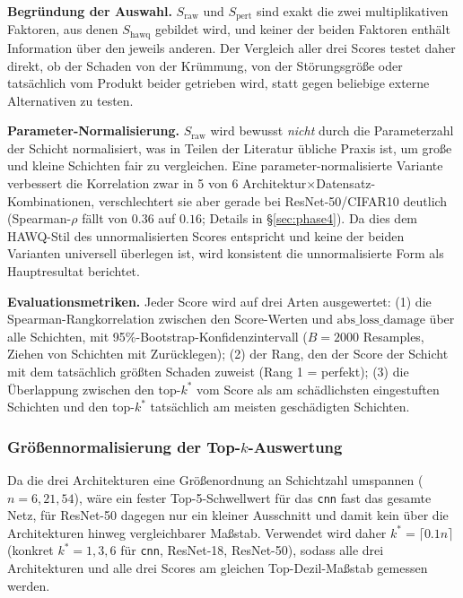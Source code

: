 \textbf{Begründung der Auswahl.} $S_{\mathrm{raw}}$ und $S_{\mathrm{pert}}$ sind exakt die zwei multiplikativen Faktoren, aus denen $S_{\mathrm{hawq}}$ gebildet wird, und keiner der beiden Faktoren enthält Information über den jeweils anderen. Der Vergleich aller drei Scores testet daher direkt, ob der Schaden von der Krümmung, von der Störungsgröße oder tatsächlich vom Produkt beider getrieben wird, statt gegen beliebige externe Alternativen zu testen.
\par\medskip

\textbf{Parameter-Normalisierung.} $S_{\mathrm{raw}}$ wird bewusst \emph{nicht} durch die Parameterzahl der Schicht normalisiert, was in Teilen der Literatur übliche Praxis ist, um große und kleine Schichten fair zu vergleichen. Eine parameter-normalisierte Variante verbessert die Korrelation zwar in 5 von 6 Architektur$\times$Datensatz-Kombinationen, verschlechtert sie aber gerade bei ResNet-50/CIFAR10 deutlich (Spearman-$\rho$ fällt von $0.36$ auf $0.16$; Details in \S\ref{sec:phase4}). Da dies dem HAWQ-Stil des unnormalisierten Scores entspricht und keine der beiden Varianten universell überlegen ist, wird konsistent die unnormalisierte Form als Hauptresultat berichtet.

\textbf{Evaluationsmetriken.} Jeder Score wird auf drei Arten ausgewertet: (1) die Spearman-Rangkorrelation zwischen den Score-Werten und $\mathrm{abs\_loss\_damage}$ über alle Schichten, mit 95\%-Bootstrap-Konfidenzintervall ($B=2000$ Resamples, Ziehen von Schichten mit Zurücklegen); (2) der Rang, den der Score der Schicht mit dem tatsächlich größten Schaden zuweist (Rang 1 = perfekt); (3) die Überlappung zwischen den top-$k^*$ vom Score als am schädlichsten eingestuften Schichten und den top-$k^*$ tatsächlich am meisten geschädigten Schichten.

\subsubsection{Größennormalisierung der Top-$k$-Auswertung}
\label{sec:norm}

Da die drei Architekturen eine Größenordnung an Schichtzahl umspannen ($n=6, 21, 54$), wäre ein fester Top-5-Schwellwert für das \texttt{cnn} fast das gesamte Netz, für ResNet-50 dagegen nur ein kleiner Ausschnitt und damit kein über die Architekturen hinweg vergleichbarer Maßstab. Verwendet wird daher $k^* = \lceil 0.1n \rceil$ (konkret $k^*=1, 3, 6$ für \texttt{cnn}, ResNet-18, ResNet-50), sodass alle drei Architekturen und alle drei Scores am gleichen Top-Dezil-Maßstab gemessen werden.

